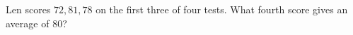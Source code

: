 Len scores $72,81,78$ on the first three of four tests. What fourth score gives an average of $80$?
